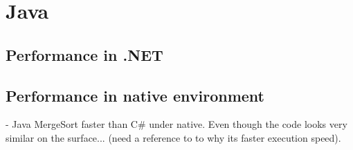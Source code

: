 \section{Java}

\subsection{Performance in .NET}



\subsection{Performance in native environment}
- Java MergeSort faster than C# under native. Even though the code looks very similar on the surface... (need a reference to to why its faster execution speed).



